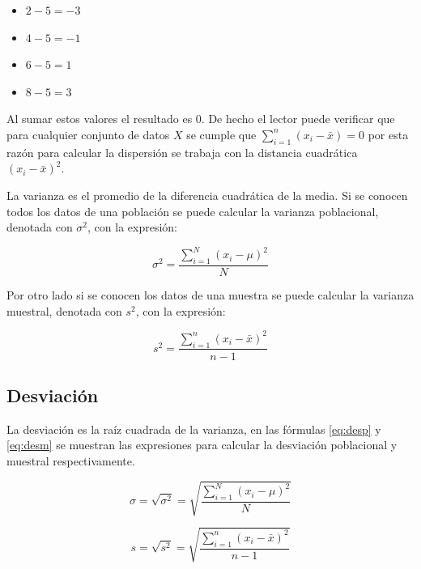 \documentclass[
]{krantz}
\providecommand{\tightlist}{%
  \setlength{\itemsep}{0pt}\setlength{\parskip}{0pt}}
\begin{document}
\begin{itemize}
\tightlist
\item
  \(2-5=-3\)
\item
  \(4-5=-1\)
\item
  \(6-5=1\)
\item
  \(8-5=3\)
\end{itemize}

Al sumar estos valores el resultado es \(0\). De hecho el lector puede verificar que para cualquier conjunto de datos \(X\) se cumple que \(\sum_{i=1}^n{\left(x_i-\bar{x}\right)}=0\) por esta razón para calcular la dispersión se trabaja con la distancia cuadrática \(\left(x_i-\bar{x}\right)^2\).

La varianza es el promedio de la diferencia cuadrática de la media. Si se conocen todos los datos de una población se puede calcular la varianza poblacional, denotada con \(\sigma^2\), con la expresión:

\begin{equation} 
  \sigma^2 = \dfrac{\sum_{i=1}^{N}\left(x_i- \mu \right)^2}{N}
  \label{eq:varp}
\end{equation}

Por otro lado si se conocen los datos de una muestra se puede calcular la varianza muestral, denotada con \(s^2\), con la expresión:

\begin{equation} 
  s^2 = \dfrac{\sum_{i=1}^{n}\left(x_i - \bar{x} \right)^2}{n-1}
  \label{eq:varm}
\end{equation}

\hypertarget{desviacion}{%
\subsection{Desviación}\label{desviacion}}

La desviación es la raíz cuadrada de la varianza, en las fórmulas \eqref{eq:desp} y \eqref{eq:desm} se muestran las expresiones para calcular la desviación poblacional y muestral respectivamente.

\begin{equation} 
  \sigma = \sqrt{\sigma^2} = \sqrt{\dfrac{\sum_{i=1}^{N}\left(x_i- \mu \right)^2}{N}}
  \label{eq:desp}
\end{equation}

\begin{equation} 
  s = \sqrt{s^2} = \sqrt{\dfrac{\sum_{i=1}^{n}\left(x_i- \bar{x} \right)^2}{n-1}}
  \label{eq:desm}
\end{equation}
\end{document}
